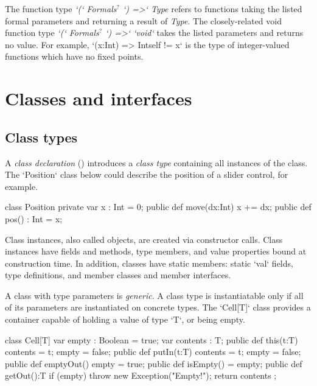 The function type 
{\em \xcd`(` Formals{$^?$} \xcd`) =>`  Type} 
refers to functions taking the
listed formal parameters and returning a result of {\em Type}.  
The closely-related void function type 
{\em \xcd`(` Formals{$^?$} \xcd`) =>`  \xcd`void`}  takes the listed
parameters and returns no value.
For example, 
\xcd`(x:Int) => Int{self != x}` 
is the type of integer-valued functions which have no fixed points.  





\section{Classes and interfaces}
\label{ReferenceTypes}

\subsection{Class types}


A {\em class declaration} () introduces a {\em class type}
containing all instances of the class.  The \xcd`Position` class below
could describe the position of a slider control, for example.

\begin{xten}
class Position {
  private var x : Int = 0;
  public def move(dx:Int) { x += dx; }
  public def pos() : Int = x;
}
\end{xten}
%

Class instances, also called objects, are created via constructor calls. Class
instances have fields and methods, type members, and value properties bound at
construction time. In addition, classes have static members: static \xcd`val` fields,
type definitions, and member classes and member interfaces.

A class with type parameters is {\em generic}. A class type is instantiatable
only if all of its parameters are instantiated on concrete types.  The
\xcd`Cell[T]` class provides a container capable of holding a value of type
\xcd`T`, or being empty.

\begin{xten}
class Cell[T] {
  var empty : Boolean = true;
  var contents : T;
  public def this(t:T) { 
     contents = t; empty = false; 
  }
  public def putIn(t:T) { 
    contents = t; empty = false; 
  }
  public def emptyOut() { empty = true; }
  public def isEmpty() = empty;
  public def getOut():T {
     if (empty) throw new Exception("Empty!");
     return contents ;
  }
}
\end{xten}
%


